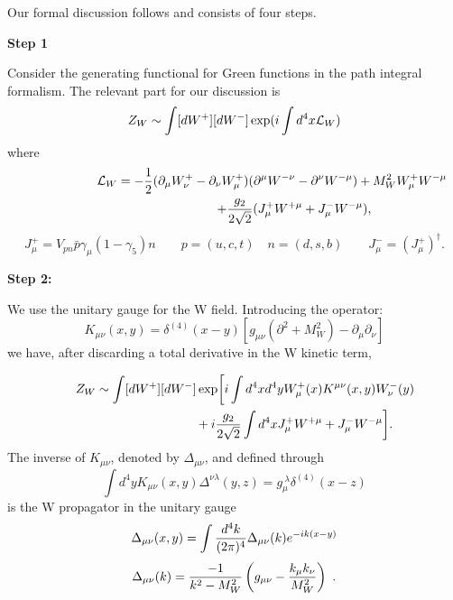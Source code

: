 \documentclass[12pt,rotate]{article}
\def\gf{\gamma_5}
\begin{document}
\begin{itemize}
\begin{itemize}
Our formal discussion follows \cite{BBL} and consists of four steps.

{\bf Step 1}

Consider
the generating functional for Green functions in the path integral
formalism. The relevant part for our discussion is
\begin{equation}\label{zw1}
Z_W\sim\int [dW^+][dW^-] \exp(i\int d^4x {\cal L}_W)  \end{equation}
where 
\begin{eqnarray}\label{lwjw}
\lefteqn{{\cal L}_W=
-{1\over 2}(\partial_\mu W^+_\nu-\partial_\nu W^+_\mu)
 (\partial^\mu W^{-\nu}-\partial^\nu W^{-\mu})+M^2_W W^+_\mu W^{-\mu}}
\hspace{3cm} \nonumber\\
& & +{g_2\over 2\sqrt{2}}(J^+_\mu W^{+\mu}+J^-_\mu W^{-\mu}),
\end{eqnarray}
\begin{equation}\label{jpn}
J^+_\mu=V_{pn} \bar p\gamma_\mu(1-\gf)n\qquad p=(u, c, t)
\quad n=(d, s, b)\qquad J^-_\mu=(J^+_\mu)^\dagger.  \end{equation}

{\bf Step 2:}

We use the unitary gauge for
the W field. 
Introducing the operator:
\begin{equation}\label{kxy}
K_{\mu\nu}(x, y)=\delta^{(4)}(x-y)\left[g_{\mu\nu}(\partial^2+
  M^2_W)-\partial_\mu\partial_\nu\right]   \end{equation}
we have, after discarding a total derivative in the W kinetic term,

\begin{eqnarray}\label{zw2}    \lefteqn{
Z_W\sim\int [dW^+][dW^-] \exp\biggl[ i\int d^4x d^4y W^+_\mu(x)
K^{\mu\nu}(x, y) W^-_\nu(y)  } \hspace{3cm}\nonumber\\
& & {}+i{g_2\over 2\sqrt{2}}\int d^4x
 J^+_\mu W^{+\mu}+J^-_\mu W^{-\mu} \biggr].
\end{eqnarray}
The inverse of $K_{\mu\nu}$, denoted by $\Delta_{\mu\nu}$, and
defined through
\begin{equation}\label{kde1}
\int d^4y K_{\mu\nu}(x, y) \Delta^{\nu\lambda}(y, z)=
 g^{\ \lambda}_\mu \delta^{(4)}(x-z)  \end{equation}
is the W propagator in the unitary gauge
\begin{equation}\label{dexy}
\Delta_{\mu\nu}(x, y)=\int{d^4k\over (2\pi)^4}\Delta_{\mu\nu}(k)
  e^{-i k(x-y)}  \end{equation}
\begin{equation}\label{dek}
\Delta_{\mu\nu}(k)={-1\over k^2-M^2_W}\left(g_{\mu\nu}-
  {k_\mu k_\nu\over M^2_W}\right)~.   \end{equation}


\end{itemize}
\end{itemize}
\end{document}
